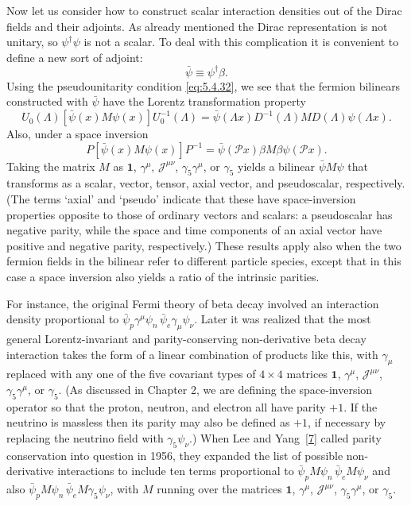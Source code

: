 Now let us consider how to construct scalar interaction densities out of the
Dirac fields and their adjoints. As already mentioned the Dirac representation
is not unitary, so $\psi^\dagger\psi$ is not a scalar. To deal with this
complication it is convenient to define a new sort of adjoint:
\begin{equation}
\bar\psi\equiv\psi^\dagger\beta.
\tag{5.5.55}\label{eq:5.5.55}
\end{equation}
Using the pseudounitarity condition \eqref{eq:5.4.32}, we see that the fermion bilinears
constructed with $\bar\psi$ have the Lorentz transformation property
\begin{equation}
U_0(\Lambda)[\bar\psi(x)M\psi(x)]U_0^{-1}(\Lambda)
=\bar\psi(\Lambda x)D^{-1}(\Lambda)MD(\Lambda)\psi(\Lambda x).
\tag{5.5.56}\label{eq:5.5.56}
\end{equation}
Also, under a space inversion
\begin{equation}
P[\bar\psi(x)M\psi(x)]P^{-1}
=\bar\psi(\mathcal P x)\beta M\beta\psi(\mathcal P x).
\tag{5.5.57}\label{eq:5.5.57}
\end{equation}
Taking the matrix $M$ as $\mathbf{1}$, $\gamma^\mu$,
$\mathcal{J}^{\mu\nu}$, $\gamma_5\gamma^\mu$, or $\gamma_5$ yields a bilinear
$\bar\psi M\psi$ that transforms as a scalar, vector, tensor, axial vector,
and pseudoscalar, respectively. (The terms `axial' and `pseudo' indicate that
these have space-inversion properties opposite to those of ordinary vectors
and scalars: a pseudoscalar has negative parity, while the space and time
components of an axial vector have positive and negative parity, respectively.)
These results apply also when the two fermion fields in the bilinear refer to
different particle species, except that in this case a space inversion also
yields a ratio of the intrinsic parities.

For instance, the original Fermi theory of beta decay involved an interaction
density proportional to $\bar\psi_p\gamma^\mu\psi_n\,
\bar\psi_e\gamma_\mu\psi_\nu$. Later it was realized that the most general
Lorentz-invariant and parity-conserving non-derivative beta decay interaction
takes the form of a linear combination of products like this, with $\gamma_\mu$
replaced with any one of the five covariant types of $4\times4$ matrices
$\mathbf{1}$, $\gamma^\mu$, $\mathcal{J}^{\mu\nu}$,
$\gamma_5\gamma^\mu$, or $\gamma_5$. (As discussed in Chapter 2, we are
defining the space-inversion operator so that the proton, neutron, and electron
all have parity $+1$. If the neutrino is massless then its parity may also be
defined as $+1$, if necessary by replacing the neutrino field with
$\gamma_5\psi_\nu$.) When Lee and Yang~\hyperref[ref:5.7]{[7]} called parity conservation into
question in 1956, they expanded the list of possible non-derivative
interactions to include ten terms proportional to
$\bar\psi_pM\psi_n\,\bar\psi_eM\psi_\nu$ and also
$\bar\psi_pM\psi_n\,\bar\psi_eM\gamma_5\psi_\nu$, with $M$ running over the
matrices $\mathbf{1}$, $\gamma^\mu$, $\mathcal{J}^{\mu\nu}$,
$\gamma_5\gamma^\mu$, or $\gamma_5$.

